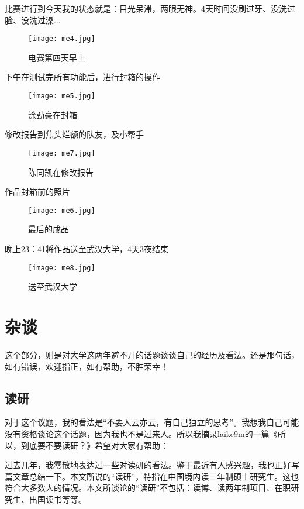 \documentclass[cn,11pt]{elegantbook}
\begin{document}
比赛进行到今天我的状态就是：目光呆滞，两眼无神。4天时间没刷过牙、没洗过脸、没洗过澡...

\begin{figure}[htbp]
	\centering
	\texttt{[image: me4.jpg]}
	\caption{电赛第四天早上 \label{fig:scatter}}
\end{figure}

下午在测试完所有功能后，进行封箱的操作

\begin{figure}[htbp]
	\centering
	\texttt{[image: me5.jpg]}
	\caption{涂劲豪在封箱 \label{fig:scatter}}
\end{figure}

修改报告到焦头烂额的队友，及小帮手
\begin{figure}[htbp]
	\centering
	\texttt{[image: me7.jpg]}
	\caption{陈同凯在修改报告 \label{fig:scatter}}
\end{figure}


作品封箱前的照片

\begin{figure}[htbp]
	\centering
	\texttt{[image: me6.jpg]}
	\caption{最后的成品 \label{fig:scatter}}
\end{figure}

晚上23：41将作品送至武汉大学，4天3夜结束
\begin{figure}[htbp]
	\centering
	\texttt{[image: me8.jpg]}
	\caption{送至武汉大学 \label{fig:scatter}}
\end{figure}

\chapter{ 杂谈 }

这个部分，则是对大学这两年避不开的话题谈谈自己的经历及看法。还是那句话，如有错误，欢迎指正，如有帮助，不胜荣幸！

\section{读研}

对于这个议题，我的看法是“不要人云亦云，有自己独立的思考”。我想我自己可能没有资格谈论这个话题，因为我也不是过来人。所以我摘录laike9m的一篇《所以，到底要不要读研？》希望对大家有帮助：


过去几年，我零散地表达过一些对读研的看法。鉴于最近有人感兴趣，我也正好写篇文章总结一下。本文所说的“读研”，特指在中国境内读三年制硕士研究生。这也符合大多数人的情况。本文所谈论的“读研”不包括：读博、读两年制项目、在职研究生、出国读书等等。
\end{document}
